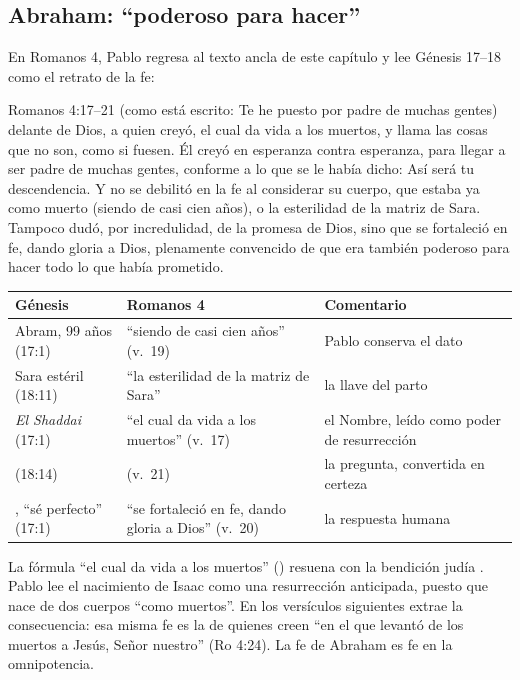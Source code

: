 \subsection{Abraham: “poderoso para hacer”}

En Romanos 4, Pablo regresa al texto ancla de este capítulo y lee Génesis 17--18 como el retrato de la fe:

\begin{verso}{Romanos 4:17–21}
(como está escrito: Te he puesto por padre de muchas gentes) delante de Dios, a quien creyó, el cual da vida a los muertos, y llama las cosas que no son, como si fuesen. Él creyó en esperanza contra esperanza, para llegar a ser padre de muchas gentes, conforme a lo que se le había dicho: Así será tu descendencia. Y no se debilitó en la fe al considerar su cuerpo, que estaba ya como muerto (siendo de casi cien años), o la esterilidad de la matriz de Sara. Tampoco dudó, por incredulidad, de la promesa de Dios, sino que se fortaleció en fe, dando gloria a Dios, plenamente convencido de que era también poderoso para hacer todo lo que había prometido.
\end{verso}

\begin{center}\small\renewcommand{\arraystretch}{1.25}
\begin{tabular}{@{}L{4.4cm}L{5.0cm}L{5.0cm}@{}}
\toprule
\textbf{Génesis} & \textbf{Romanos 4} & \textbf{Comentario} \\ \midrule
Abram, 99 años (17:1) & ``siendo de casi cien años'' (v.~19) & Pablo conserva el dato \\
Sara estéril (18:11) & ``la esterilidad de la matriz de Sara'' & la llave del parto \\
\emph{El Shaddai} (17:1) & ``el cual da vida a los muertos'' (v.~17) & el Nombre, leído como poder de resurrección \\
 (18:14) &  (v.~21) & la pregunta, convertida en certeza \\
, ``sé perfecto'' (17:1) & ``se fortaleció en fe, dando gloria a Dios'' (v.~20) & la respuesta humana \\
\bottomrule
\end{tabular}\end{center}

La fórmula ``el cual da vida a los muertos'' () resuena con la bendición judía . Pablo lee el nacimiento de Isaac como una resurrección anticipada, puesto que nace de dos cuerpos ``como muertos''. En los versículos siguientes extrae la consecuencia: esa misma fe es la de quienes creen ``en el que levantó de los muertos a Jesús, Señor nuestro'' (Ro 4:24). La fe de Abraham es fe en la omnipotencia.

